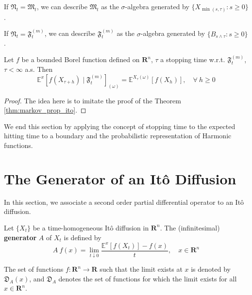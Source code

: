 If $\mathfrak{N}_t = \mathfrak{M}_t$, we can describe $\mathfrak{M}_t$ as the $\sigma$-algebra generated by $\{ X_{\min(s, \tau)} : s \geq 0 \}$.

If $\mathfrak{N}_t = \mathfrak{F}_t^{(m)}$, we can describe $\mathfrak{F}_t^{(m)}$ as the $\sigma$-algebra generated by $\{ B_{s \wedge \tau} : s \geq 0 \}$.

\begin{theorem}
    Let $f$ be a bounded Borel function defined on $\textbf{R}^n$, $\tau$ a stopping time w.r.t. $\mathfrak{F}_t^{(m)}$, $\tau < \infty$ a.s. Then 
    \begin{equation}\label{eq:str_markov_property}
        \mathbb{E}^x [f(X_{\tau+h}) \mid \mathfrak{F}_t^{(m)}]_{(\omega)} = \mathbb{E}^{X_\tau(\omega)} [f(X_h)], \quad \forall ~h \geq 0
    \end{equation}
\end{theorem}

\begin{proof}
    The idea here is to imitate the proof of the Theorem \ref{thm:markov_prop_ito}.
\end{proof}

We end this section by applying the concept of stopping time to the expected hitting time to a boundary and the probabilistic representation of Harmonic functions. 

\section{The Generator of an Itô Diffusion}

In this section, we associate a second order partial differential operator to an Itô diffusion.

\begin{definition}[Generator]
    Let $\{ X_t \}$ be a time-homogeneous Itô diffusion in $\textbf{R}^n$. The (infinitesimal) \textbf{generator} $A$ of $X_t$ is defined by 
    \begin{equation}\label{eq:202301231654}
        A~f(x) = \lim_{t \downarrow 0} \frac{\mathbb{E}^x [ f(X_t)] - f(x)}{t}, \quad x \in \textbf{R}^n
    \end{equation}

    The set of functions $f : \textbf{R}^n \longrightarrow \textbf{R}$ such that the limit exists at $x$ is denoted by $\mathfrak{D}_A(x)$, and $\mathfrak{D}_A$ denotes the set of functions for which the limit exists for all $x \in \textbf{R}^n$.
\end{definition}

